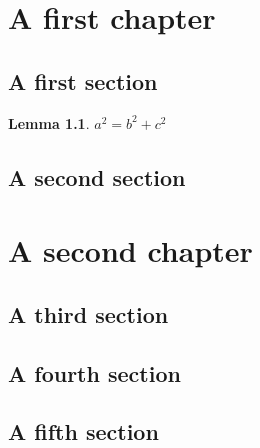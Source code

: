 \documentclass{report}
\theoremstyle{plain}
\newtheorem{lemma}[subsection]{Lemma}
\theoremstyle{definition}
\theoremstyle{remark}
\numberwithin{equation}{subsection}
\begin{document}
\chapter{A first chapter}
\label{chapter:first}

\section{A first section}
\label{section:first}

\begin{lemma}
  \label{lemma:pythagoras}
  $a^2=b^2+c^2$
\end{lemma}

\section{A second section}
\label{section:second}


\chapter{A second chapter}
\label{chapter:second}

\section{A third section}
\label{section:third}

\section{A fourth section}
\label{section:fourth}

\section{A fifth section}
\label{section:fifth}
\end{document}
